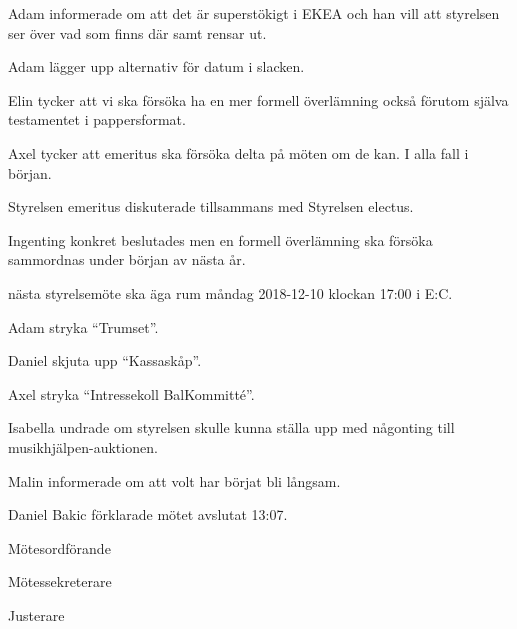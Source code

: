 \documentclass[10pt]{article}
\def\mo{Daniel Bakic}
\def\ms{Axel Voss}
\def\ji{Fanny Månefjord}
\begin{document}
\begin{paragrafer}

	Adam informerade om att det är superstökigt i EKEA och han vill att styrelsen ser över vad som finns där samt rensar ut. 

	Adam lägger upp alternativ för datum i slacken.

	
	Elin tycker att vi ska försöka ha en mer formell överlämning också förutom själva testamentet i pappersformat.

	Axel tycker att emeritus ska försöka delta på möten om de kan. I alla fall i början.

	Styrelsen emeritus diskuterade tillsammans med Styrelsen electus.

	Ingenting konkret beslutades men en formell överlämning ska försöka sammordnas under början av nästa år. 


	\Mba nästa styrelsemöte ska äga rum måndag 2018-12-10 klockan 17:00 i E:C.

	\newpage

	Adam \ypa stryka ``Trumset''.

	Daniel \ypa skjuta upp ``Kassaskåp''.

	Axel \ypa stryka ``Intressekoll BalKommitté''.

	\Mbabay


	Isabella undrade om styrelsen skulle kunna ställa upp med någonting till musikhjälpen-auktionen.
	
	Malin informerade om att volt har börjat bli långsam.

	
	{\mo} förklarade mötet avslutat 13:07.

\end{paragrafer}

\hidesignfoot
\begin{signatures}{3}
	\signature{\mo}{Mötesordförande}
	\signature{\ms}{Mötessekreterare}
	\signature{\ji}{Justerare}
\end{signatures}
\end{document}
